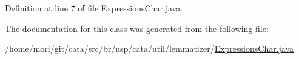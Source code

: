 Definition at line 7 of file Expressions\+Char.\+java.



The documentation for this class was generated from the following file\+:\begin{DoxyCompactItemize}
\item 
/home/mori/git/cata/src/br/usp/cata/util/lemmatizer/\hyperlink{_expressions_char_8java}{Expressions\+Char.\+java}\end{DoxyCompactItemize}
